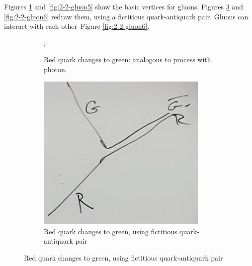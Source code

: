 \documentclass[]{article}
\begin{document}
Figures \ref{fig:2-2-gluon3} and \ref{fig:2-2-gluon5} show the basic vertices for gluons. Figures \ref{fig:2-2-gluon4} and \ref{fig:2-2-gluon6} redraw them, using a fictitious quark-antiquark pair. Gluons can interact with each other--Figure \ref{fig:2-2-gluon6}.
\begin{figure}[H]
	\caption{The basic vertices of \gls{gls:QCD} -- Quarks}
	\begin{subfigure}[t]{0.45\textwidth}
		\caption{Red quark changes to green: analogous to process with photon.}\label{fig:2-2-gluon3}
		;
	\end{subfigure}
	\hfill
	\begin{subfigure}[t]{0.45\textwidth}
		\caption{Red quark changes to green, using fictitious quark-antiquark pair}
		\label{fig:2-2-gluon4}
		\includegraphics[width=0.9\textwidth]{2-2-gluon4}
	\end{subfigure}

\end{figure}
\end{document}
